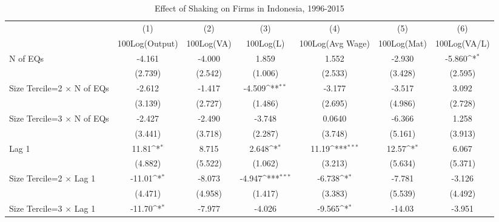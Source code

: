 \begin{table}[htbp]\centering
\def\sym#1{\ifmmode^{#1}\else\(^{#1}\)\fi}
\caption{Effect of Shaking on Firms in Indonesia, 1996-2015}
\begin{tabular}{l*{6}{c}}
\toprule
                &\multicolumn{1}{c}{(1)}&\multicolumn{1}{c}{(2)}&\multicolumn{1}{c}{(3)}&\multicolumn{1}{c}{(4)}&\multicolumn{1}{c}{(5)}&\multicolumn{1}{c}{(6)}\\
                &\multicolumn{1}{c}{100Log(Output)}&\multicolumn{1}{c}{100Log(VA)}&\multicolumn{1}{c}{100Log(L)}&\multicolumn{1}{c}{100Log(Avg Wage)}&\multicolumn{1}{c}{100Log(Mat)}&\multicolumn{1}{c}{100Log(VA/L)}\\
\midrule
N of EQs        &   -4.161         &   -4.000         &    1.859         &    1.552         &   -2.930         &   -5.860\sym{*}  \\
                &  (2.739)         &  (2.542)         &  (1.006)         &  (2.533)         &  (3.428)         &  (2.595)         \\
\addlinespace
Size Tercile=2 $\times$ N of EQs&   -2.612         &   -1.417         &   -4.509\sym{**} &   -3.177         &   -3.517         &    3.092         \\
                &  (3.139)         &  (2.727)         &  (1.486)         &  (2.695)         &  (4.986)         &  (2.728)         \\
\addlinespace
Size Tercile=3 $\times$ N of EQs&   -2.427         &   -2.490         &   -3.748         &   0.0640         &   -6.366         &    1.258         \\
                &  (3.441)         &  (3.718)         &  (2.287)         &  (3.748)         &  (5.161)         &  (3.913)         \\
\addlinespace
Lag 1           &    11.81\sym{*}  &    8.715         &    2.648\sym{*}  &    11.19\sym{***}&    12.57\sym{*}  &    6.067         \\
                &  (4.882)         &  (5.522)         &  (1.062)         &  (3.213)         &  (5.634)         &  (5.371)         \\
\addlinespace
Size Tercile=2 $\times$ Lag 1&   -11.01\sym{*}  &   -8.073         &   -4.947\sym{***}&   -6.738\sym{*}  &   -7.781         &   -3.126         \\
                &  (4.471)         &  (4.958)         &  (1.417)         &  (3.383)         &  (5.539)         &  (4.492)         \\
\addlinespace
Size Tercile=3 $\times$ Lag 1&   -11.70\sym{*}  &   -7.977         &   -4.026         &   -9.565\sym{*}  &   -14.03         &   -3.951         \\

\end{tabular}
\end{table}
